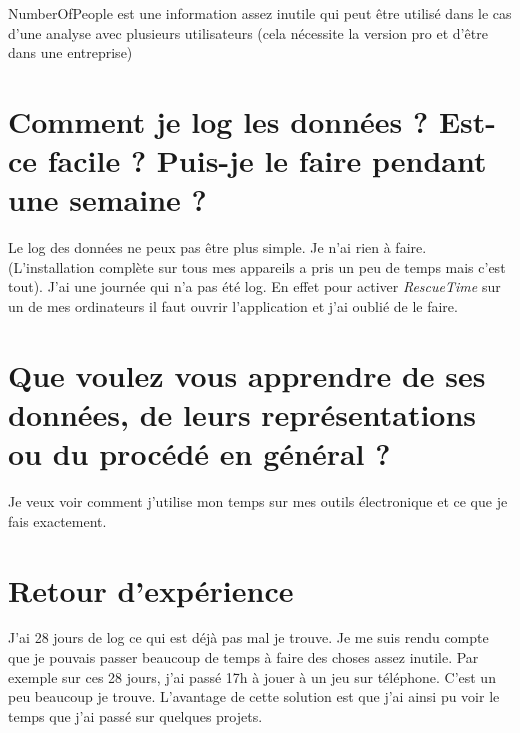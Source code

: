 \documentclass{article}
\begin{document}
 NumberOfPeople est une information assez inutile qui peut être utilisé dans le cas d'une analyse avec plusieurs utilisateurs (cela nécessite la version pro et d'être dans une entreprise)


\section*{Comment je log les données ? Est-ce facile ? Puis-je le faire pendant une semaine ? }

Le log des données ne peux pas être plus simple. Je n'ai rien à faire. (L'installation complète sur tous mes appareils a pris un peu de temps mais c'est tout).
J'ai une journée qui n'a pas été log. En effet pour activer { \em RescueTime} sur un de mes ordinateurs il faut ouvrir l'application et j'ai oublié de le faire.


\section*{Que voulez vous apprendre de ses données, de leurs représentations ou du procédé en général ? }

Je veux voir comment j'utilise mon temps sur mes outils électronique et ce que je fais exactement. 

\section*{Retour d'expérience}

J'ai 28 jours de log ce qui est déjà pas mal je trouve. Je me suis rendu compte que je pouvais passer beaucoup de temps à faire des choses assez inutile.
Par exemple sur ces 28 jours, j'ai passé 17h à jouer à un jeu sur téléphone. C'est un peu beaucoup je trouve.
L'avantage de cette solution est que j'ai ainsi pu voir le temps que j'ai passé sur quelques projets. 
\end{document}
